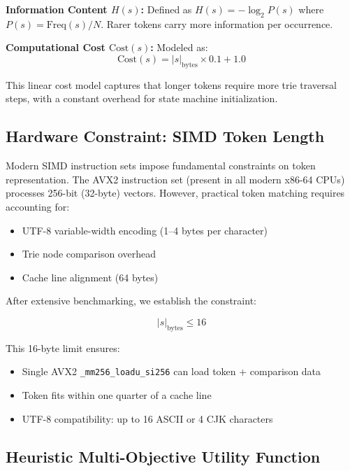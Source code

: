 \documentclass[11pt,a4paper,twocolumn]{article}
\begin{document}
\textbf{Information Content $H(s)$:} Defined as $H(s) = -\log_2 P(s)$ where $P(s) = \text{Freq}(s) / N$. Rarer tokens carry more information per occurrence.

\textbf{Computational Cost $\text{Cost}(s)$:} Modeled as:
\begin{equation}
\text{Cost}(s) = |s|_{\text{bytes}} \times 0.1 + 1.0
\label{eq:cost}
\end{equation}

This linear cost model captures that longer tokens require more trie traversal steps, with a constant overhead for state machine initialization.

\subsection{Hardware Constraint: SIMD Token Length}

Modern SIMD instruction sets impose fundamental constraints on token representation. The AVX2 instruction set (present in all modern x86-64 CPUs) processes 256-bit (32-byte) vectors. However, practical token matching requires accounting for:

\begin{itemize}
    \item UTF-8 variable-width encoding (1--4 bytes per character)
    \item Trie node comparison overhead
    \item Cache line alignment (64 bytes)
\end{itemize}

After extensive benchmarking, we establish the constraint:

\begin{equation}
|s|_{\text{bytes}} \leq 16
\label{eq:simd_constraint}
\end{equation}

This 16-byte limit ensures:
\begin{itemize}
    \item Single AVX2 \texttt{\_mm256\_loadu\_si256} can load token + comparison data
    \item Token fits within one quarter of a cache line
    \item UTF-8 compatibility: up to 16 ASCII or 4 CJK characters
\end{itemize}

\subsection{Heuristic Multi-Objective Utility Function}
\end{document}
